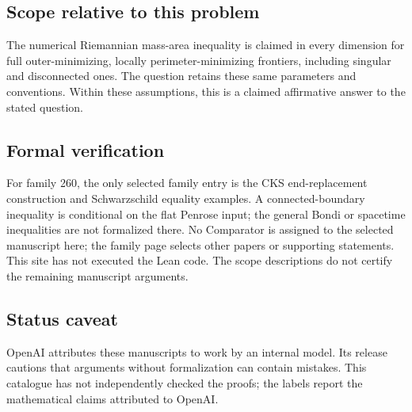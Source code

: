 \documentclass[11pt]{article}
\begin{document}
\subsection{Scope relative to this problem}
The numerical Riemannian mass-area inequality is claimed in every dimension for full outer-minimizing, locally perimeter-minimizing frontiers, including singular and disconnected ones. The question retains these same parameters and conventions. Within these assumptions, this is a claimed affirmative answer to the stated question.

\subsection{Formal verification}
For family 260, the only selected family entry is the CKS end-replacement construction and Schwarzschild equality examples. A connected-boundary inequality is conditional on the flat Penrose input; the general Bondi or spacetime inequalities are not formalized there. No Comparator is assigned to the selected manuscript here; the family page selects other papers or supporting statements. This site has not executed the Lean code. The scope descriptions do not certify the remaining manuscript arguments.

\subsection{Status caveat}
OpenAI attributes these manuscripts to work by an internal model. Its release cautions that arguments without formalization can contain mistakes. This catalogue has not independently checked the proofs; the labels report the mathematical claims attributed to OpenAI.
\end{document}
